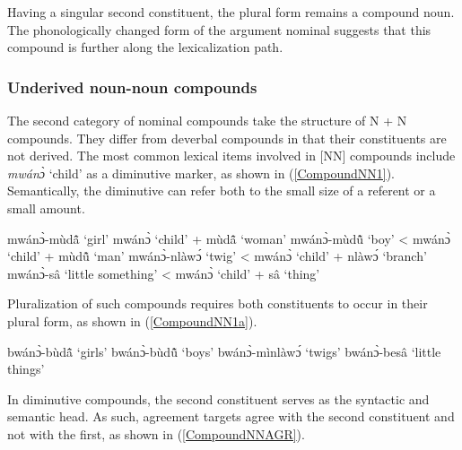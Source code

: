 \noindent Having a singular second constituent, the plural form remains a compound noun. The phonologically changed form of the argument nominal suggests that this compound is further along the lexicalization path.

\subsubsection{Underived noun-noun compounds}
\label{sec:NNCompound}

The second category of nominal compounds take the structure of N + N compounds. They differ from deverbal compounds in that their constituents are not derived.  The most common lexical items involved in [NN] compounds include {\itshape mwánɔ̀} `child'  as a diminutive marker, as shown in (\ref{CompoundNN1}). Semantically, the diminutive can refer both to the small size of a referent or a small amount.

\begin{exe}
\ex\label{CompoundNN1} 
\begin{xlist}
\ex mwánɔ̀-mùdã̂ `girl' mwánɔ̀ `child' + mùdã̂ `woman'
\ex mwánɔ̀-mùdũ̂ `boy' < mwánɔ̀ `child' + mùdũ̂ `man'
\ex mwánɔ̀-nlàwɔ́ `twig' < mwánɔ̀ `child' + nlàwɔ́ `branch'
\ex mwánɔ̀-sâ `little something' < mwánɔ̀ `child' + sâ `thing'
\end{xlist}
\end{exe}

Pluralization of such compounds requires both constituents to occur in their plural form, as shown in (\ref{CompoundNN1a}).

\begin{exe}
\ex\label{CompoundNN1a} 
\begin{xlist}
\ex bwánɔ̀-bùdã̂ `girls' 
\ex bwánɔ̀-bùdũ̂ `boys'
\ex bwánɔ̀-mìnlàwɔ́ `twigs'
\ex bwánɔ̀-besâ `little things' 
\end{xlist}
\end{exe}

In diminutive compounds, the second constituent serves as the syntactic and semantic head. As such, agreement targets agree with the second constituent and not with the first, as shown in (\ref{CompoundNNAGR}).

